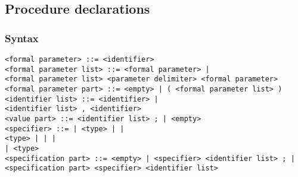 \documentclass[a4paper,11pt]{article}
\begin{document}
\subsection{Procedure declarations}
\label{LblProcedureDeclarations}

\subsubsection{Syntax}
\label{LblProcedureDeclarationsSyntax}

\begin{flushleft}
\vspace{0.2em}\texttt{<formal parameter> ::= <identifier>}\\

\vspace{0.2em}\texttt{<formal parameter list> ::= <formal parameter> |\\
  \hspace{1.0cm}<formal parameter list> <parameter delimiter> <formal parameter>}\\

\vspace{0.2em}\texttt{<formal parameter part> ::= <empty> | ( <formal parameter list> )}\\

\vspace{0.2em}\texttt{<identifier list> ::= <identifier> |\\
  \hspace{1.0cm}<identifier list> , <identifier>}\\

\vspace{0.2em}\texttt{<value part> ::=  <identifier list> ; | <empty>}\\

\vspace{0.2em}\texttt{<specifier> ::=  | <type> |  |\\
  \hspace{1.0cm}<type>  |  |  |\\
  \hspace{1.0cm} | <type> }\\

\vspace{0.2em}\texttt{<specification part> ::= <empty> | <specifier> <identifier list> ; |\\
  \hspace{1.0cm}<specification part> <specifier> <identifier list>}\\


\end{flushleft}
\end{document}
